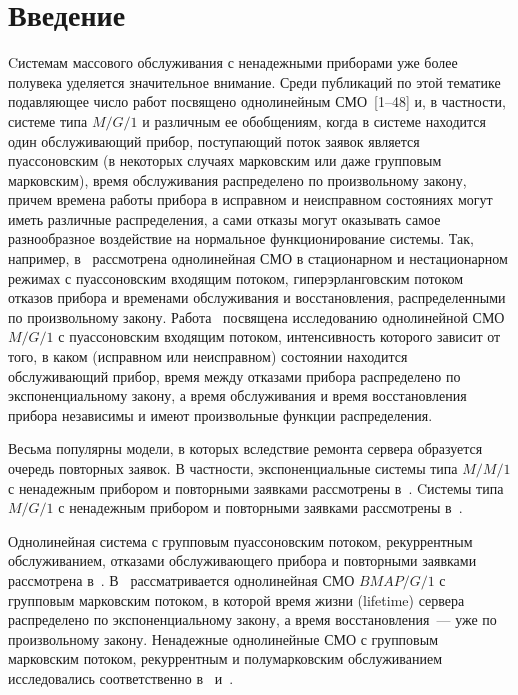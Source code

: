       \begin{multicols}{2}

      \label{st\stat}

\section{Введение}

Cистемам массового обслуживания с ненадежными приборами уже более полувека
уделяется значительное внимание.
Среди публикаций по этой тематике подавляющее число работ посвящено однолинейным
СМО~[1--48]
и, в частности, системе типа $M/G/1$ и различным ее обобщениям,
когда в системе находится один обслуживающий прибор,
поступающий поток заявок является пуассоновским
(в некоторых случаях марковским или даже групповым марковским),
время обслуживания распределено по произвольному закону, причем времена
работы прибора в исправном и неисправном состояниях могут иметь различные распределения,
а сами отказы могут оказывать самое разнообразное воздействие на нормальное функционирование системы.
Так, например, в~\cite{Mikadze-Khocholava-Khurodze_2003, Mikadze-Khocholava-Khurodze_2004, Mikadze-Khocholava_2005}
рассмотрена однолинейная СМО
в стационарном и нестационарном режимах с пуассоновским входящим потоком,
гиперэрланговским потоком отказов прибора и временами обслуживания и восстановления,
распределенными по произвольному закону.
Работа~\cite{Kotlyar_1995} посвящена исследованию однолинейной
СМО $M/G/1$ с пуассоновским входящим потоком,
интенсивность которого зависит от того, в каком (исправном или неисправном) состоянии находится обслуживающий прибор,
время между отказами прибора распределено по экспоненциальному закону,
а время обслуживания и время восстановления прибора независимы
и имеют произвольные функции распределения.

Весьма популярны модели, в которых вследствие ремонта сервера образуется очередь повторных заявок.
В частности, экспоненциальные\linebreak
системы типа $M/M/1$ с ненадежным прибором и повторными заявками рассмотрены 
в~\cite{Li-Zhao_2005, Sherman-Kharoufeh_2006, Falin_2008}.
Cистемы типа $M/G/1$ с ненадежным прибором и повторными заявками рассмотрены
в~\cite{Yang-Li_1994, Wang-Cao-Li_2001, Krishna-Kumar-Pavai-Vijayakumar_2002, Djellab_2002, Li-Wang_2006, Sztrik-Almasi-Roszik_2006, Wang_2008}.

Однолинейная система с групповым пуассоновским потоком, рекуррентным обслуживанием,
отказами обслуживающего прибора и повторными заявками рассмотрена в~\cite{Atencia-Bouza-Moreno_2008}.
В~\cite{Li-Ying-Zhao_2006} рассматривается однолинейная СМО
$BM\!AP/G/1$ с групповым марковским потоком, в которой время жизни (lifetime) сервера
распределено по экспоненциальному закону, а время восстановления~--- уже по произвольному закону.
Ненадежные однолинейные СМО с групповым марковским потоком,
рекуррентным и полумарковским обслуживанием исследовались соответственно в~\cite{Dudin-Kazimirsky-Klimenok_2004} 
и~\cite{Dudin_2002}.


\end{multicols}
